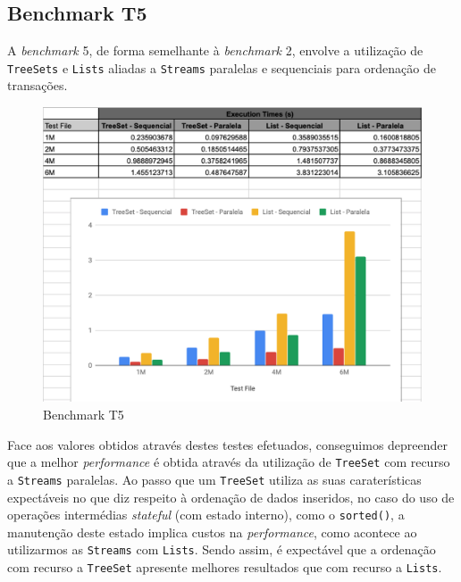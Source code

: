 \documentclass{article}
\begin{document}
\subsection{Benchmark T5}
A \textit{benchmark} 5, de forma semelhante à \textit{benchmark} 2, envolve a utilização de \texttt{TreeSets} e \texttt{Lists} aliadas a \texttt{Streams} paralelas e sequenciais para ordenação de transações.

\begin{figure}[H]
    \centering
    \includegraphics[width=12cm]{Pictures/T5.png}
    \caption{Benchmark T5}
\end{figure}

Face aos valores obtidos através destes testes efetuados, conseguimos depreender que a melhor \textit{performance} é obtida através da utilização de \texttt{TreeSet} com recurso a \texttt{Streams} paralelas.
Ao passo que um \texttt{TreeSet} utiliza as suas caraterísticas expectáveis no que diz respeito à ordenação de dados inseridos, no caso do uso de operações intermédias \textit{stateful} (com estado interno), como o \texttt{sorted()}, a manutenção deste estado implica custos na \textit{performance}, como acontece ao utilizarmos as \texttt{Streams} com \texttt{Lists}. Sendo assim, é expectável que a ordenação com recurso a \texttt{TreeSet} apresente melhores resultados que com recurso a \texttt{Lists}. 

\newpage
\end{document}

